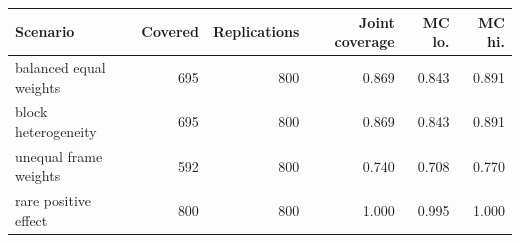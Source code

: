 \begin{tabular}{lrrrrr}
\toprule
Scenario & Covered & Replications & Joint coverage & MC lo. & MC hi. \\
\midrule
balanced equal weights & 695 & 800 & 0.869 & 0.843 & 0.891 \\
block heterogeneity & 695 & 800 & 0.869 & 0.843 & 0.891 \\
unequal frame weights & 592 & 800 & 0.740 & 0.708 & 0.770 \\
rare positive effect & 800 & 800 & 1.000 & 0.995 & 1.000 \\
\bottomrule
\end{tabular}
